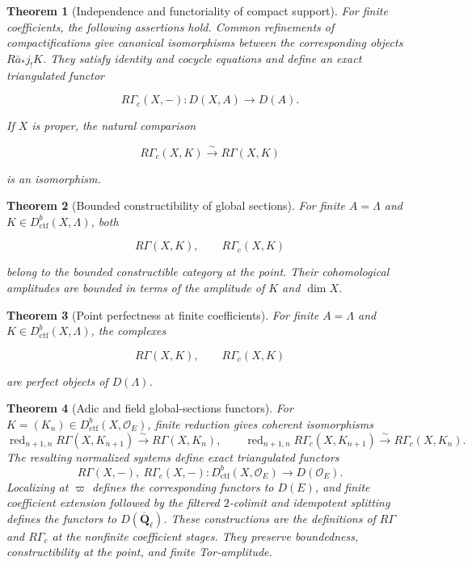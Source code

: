 \documentclass[10pt]{article}
\newtheorem{theorem}{Theorem}[section]
\theoremstyle{definition}
\newcommand{\Qlb}{\overline{\mathbf Q}_\ell}
\newcommand{\OO}{\mathcal O}
\newcommand{\Dctf}{D^b_{\mathrm{ctf}}}
\newcommand{\RG}{R\Gamma}
\newcommand{\RGc}{R\Gamma_c}
\newcommand{\red}{\operatorname{red}}
\begin{document}
\begin{theorem}[Independence and functoriality of compact support]
For finite coefficients, the following assertions hold.
Common refinements of compactifications give canonical isomorphisms between
the corresponding objects \(R\bar a_*j_!K\).  They satisfy identity and
cocycle equations and define an exact triangulated functor

\[
 \RGc(X,-):D(X,A)\longrightarrow D(A).
\]

If \(X\) is proper, the natural comparison

\[
 \RGc(X,K)\xrightarrow{\sim}\RG(X,K)
\]

is an isomorphism.
\end{theorem}

\begin{theorem}[Bounded constructibility of global sections]
For finite \(A=\Lambda\) and \(K\in\Dctf(X,\Lambda)\), both

\[
 \RG(X,K),\qquad\RGc(X,K)
\]

belong to the bounded constructible category at the point.  Their
cohomological amplitudes are bounded in terms of the amplitude of \(K\) and
\(\dim X\).
\end{theorem}

\begin{theorem}[Point perfectness at finite coefficients]
For finite \(A=\Lambda\) and \(K\in\Dctf(X,\Lambda)\), the complexes

\[
 \RG(X,K),\qquad\RGc(X,K)
\]

are perfect objects of \(D(\Lambda)\).
\end{theorem}

\begin{theorem}[Adic and field global-sections functors]
For \(K=(K_n)\in\Dctf(X,\OO_E)\), finite reduction gives coherent
isomorphisms
\[
 \red_{n+1,n}\RG(X,K_{n+1})\xrightarrow{\sim}\RG(X,K_n),
 \qquad
 \red_{n+1,n}\RGc(X,K_{n+1})\xrightarrow{\sim}\RGc(X,K_n).
\]
The resulting normalized systems define exact triangulated functors
\[
 \RG(X,-),\ \RGc(X,-):\Dctf(X,\OO_E)\longrightarrow D(\OO_E).
\]
Localizing at \(\varpi\) defines the corresponding functors to \(D(E)\), and
finite coefficient extension followed by the filtered \(2\)-colimit and
idempotent splitting defines the functors to \(D(\Qlb)\).  These constructions
are the definitions of \(\RG\) and \(\RGc\) at the nonfinite coefficient
stages.  They preserve boundedness, constructibility at the point, and finite
Tor-amplitude.
\end{theorem}
\end{document}
